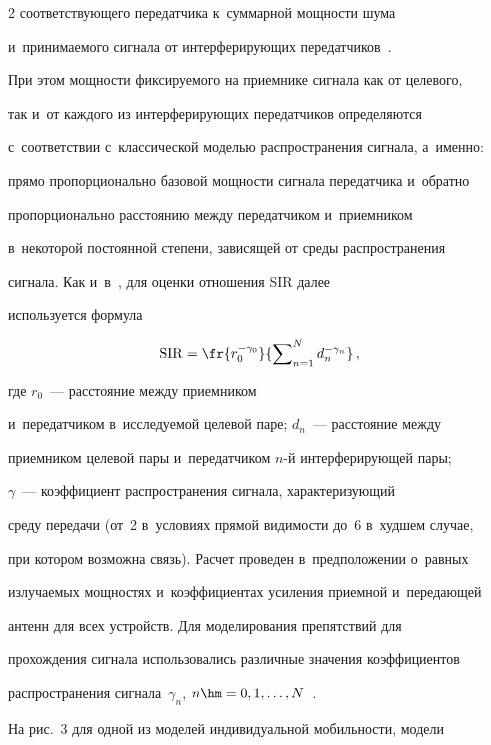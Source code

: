 \begin{multicols}{2}
соответствующего передатчика к~суммарной мощ\-ности шума 

и~при\-ни\-ма\-емо\-го сигнала от интерферирующих передатчиков~\cite{12-sg}. 

При этом мощ\-ности фик\-си\-ру\-емо\-го на приемнике сигнала как от целевого, 

так и~от каждого из интерферирующих передатчиков определяются 

с~соответствии с~классической моделью распространения сигнала, а~именно: 

прямо пропорционально базовой мощ\-ности сигнала передатчика и~обратно 

пропорционально рас\-сто\-янию меж\-ду передатчиком и~приемником 

в~некоторой по\-сто\-ян\-ной степени, зависящей от среды рас\-про\-стра\-не\-ния 

сигнала. Как и~в~\cite{12-sg, 13-sg}, для оценки отношения SIR далее 

используется формула 

$$

\mathrm{SIR}= \fr{r_0^{-\gamma_0}}{\sum\nolimits^N_{n=1} 

d_n^{-\gamma_n}}\,,

$$

 где $r_0$~--- рас\-сто\-яние между приемником 

и~передатчиком в~ис\-сле\-ду\-емой целевой паре; $d_n$~--- рассто\-яние между 

приемником целевой пары и~передатчиком $n$-й ин\-тер\-фе\-ри\-ру\-ющей пары; 

$\gamma$~--- коэффициент распространения сигнала, ха\-рак\-те\-ри\-зу\-ющий 

среду передачи (от~2 в~условиях прямой ви\-ди\-мости до~6 в~худшем случае, 

при котором возможна связь). Расчет проведен в~предположении о~рав\-ных 

из\-лу\-ча\-емых мощностях и~коэффициентах усиления приемной и~пе\-ре\-да\-ющей 

антенн для всех устройств. Для моделирования препятствий для 

про\-хож\-де\-ния сигнала использовались различные значения коэффициентов 

рас\-про\-стра\-не\-ния сигнала~$\gamma_n$, $n\hm= 0,1,\ldots, N$~\cite{13-sg}.

  

  На рис.~3 для одной из моделей индивидуальной мо\-биль\-ности, модели 


\end{multicols}
